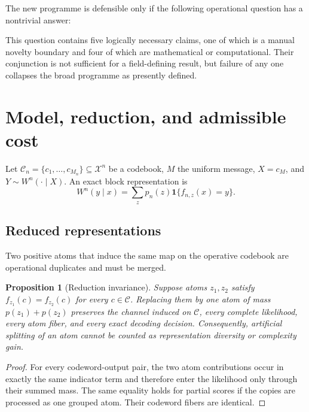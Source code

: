 \documentclass[11pt]{article}
\newtheorem{proposition}[theorem]{Proposition}
\theoremstyle{definition}
\theoremstyle{remark}
\newcommand{\X}{\mathcal X}
\newcommand{\C}{\mathcal C}
\newcommand{\one}{\mathbf 1}
\begin{document}
The new programme is defensible only if the following operational question has a nontrivial answer:
\begin{center}
\end{center}

This question contains five logically necessary claims, one of which is a manual novelty boundary and four of which are mathematical or computational. Their conjunction is not sufficient for a field-defining result, but failure of any one collapses the broad programme as presently defined.

\section{Model, reduction, and admissible cost}

Let $\C_n=\{c_1,\ldots,c_{M_n}\}\subseteq\X^n$ be a codebook, $M$ the uniform message, $X=c_M$, and $Y\sim W^n(\cdot\mid X)$. An exact block representation is
\begin{equation}
 W^n(y\mid x)=\sum_z p_n(z)\one\{f_{n,z}(x)=y\}.
 \label{eq:blockrep}
\end{equation}

\subsection{Reduced representations}

Two positive atoms that induce the same map on the operative codebook are operational duplicates and must be merged.

\begin{proposition}[Reduction invariance]
Suppose atoms $z_1,z_2$ satisfy $f_{z_1}(c)=f_{z_2}(c)$ for every $c\in\C$. Replacing them by one atom of mass $p(z_1)+p(z_2)$ preserves the channel induced on $\C$, every complete likelihood, every atom fiber, and every exact decoding decision. Consequently, artificial splitting of an atom cannot be counted as representation diversity or complexity gain.
\end{proposition}

\begin{proof}
For every codeword-output pair, the two atom contributions occur in exactly the same indicator term and therefore enter the likelihood only through their summed mass. The same equality holds for partial scores if the copies are processed as one grouped atom. Their codeword fibers are identical.
\end{proof}
\end{document}
